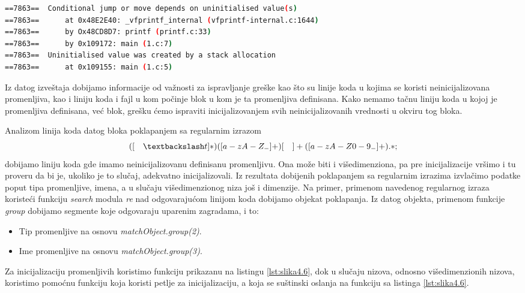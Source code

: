\documentclass[12pt,oneside]{memoir}
\theoremstyle{plain}
\theoremstyle{definition}
\begin{document}

\begin{lstlisting}[style=terminal,caption={Ispis greške korišćenja statičke neinicijalizovane promenljive}, label={lst:slika4.5},language={bash}]   
==7863==  Conditional jump or move depends on uninitialised value(s)
==7863==      at 0x48E2E40: _vfprintf_internal (vfprintf-internal.c:1644) 
==7863==      by Ox48CD8D7: printf (printf.c:33)
==7863==      by 0x109172: main (1.c:7)
==7863==  Uninitialised value was created by a stack allocation
==7863==      at 0x109155: main (1.c:5)
\end{lstlisting}

Iz datog izveštaja dobijamo informacije od važnosti za ispravljanje greške kao što su linije koda u kojima se koristi neinicijalizovana promenljiva, kao i liniju koda i fajl u kom počinje blok u kom je ta promenljiva definisana. Kako nemamo tačnu liniju koda u kojoj je promenljiva definisana, već blok, grešku ćemo ispraviti inicijalizovanjem svih neinicijalizovanih vrednosti u okviru tog bloka. 

Analizom linija koda datog bloka poklapanjem sa regularnim izrazom 
$$ ([\quad\textbackslash t]*)([a-zA-Z_-]+)[\quad]+([a-zA-Z0-9_-]+).*; $$
dobijamo liniju koda gde imamo neinicijalizovanu definisanu promenljivu. Ona može biti i višedimenziona, pa pre inicijalizacije vršimo i tu proveru da bi je, ukoliko je to slučaj, adekvatno inicijalizovali. Iz rezultata dobijenih poklapanjem sa regularnim izrazima izvlačimo podatke poput tipa promenljive, imena, a u slučaju višedimenzionog niza još i dimenzije. Na primer, primenom navedenog regularnog izraza koristeći funkciju \textit{search} modula \textit{re} nad odgovarajućom linijom koda dobijamo objekat poklapanja. Iz datog objekta, primenom funkcije \textit{group} dobijamo segmente koje odgovaraju uparenim zagradama, i to:
\begin{itemize}
\item Tip promenljive na osnovu \textit{matchObject.group(2)}.
\item Ime promenljive na osnovu \textit{matchObject.group(3)}.
\end{itemize} 
Za inicijalizaciju promenljivih koristimo funkciju prikazanu na listingu \ref{lst:slika4.6}, dok u slučaju nizova, odnosno višedimenzionih nizova, koristimo pomoćnu funkciju koja koristi petlje za inicijalizaciju, a koja se suštinski oslanja na funkciju sa listinga \ref{lst:slika4.6}.
\end{document}
